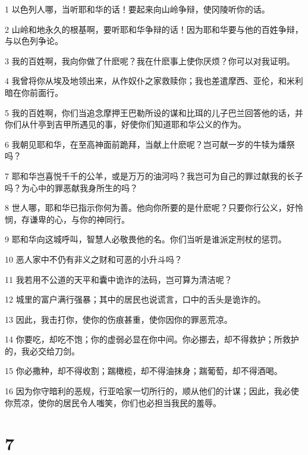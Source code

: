 \par 1 以色列人哪，当听耶和华的话！要起来向山岭争辩，使冈陵听你的话。
\par 2 山岭和地永久的根基啊，要听耶和华争辩的话！因为耶和华要与他的百姓争辩，与以色列争论。
\par 3 我的百姓啊，我向你做了什麽呢？我在什麽事上使你厌烦？你可以对我证明。
\par 4 我曾将你从埃及地领出来，从作奴仆之家救赎你；我也差遣摩西、亚伦，和米利暗在你前面行。
\par 5 我的百姓啊，你们当追念摩押王巴勒所设的谋和比珥的儿子巴兰回答他的话，并你们从什亭到吉甲所遇见的事，好使你们知道耶和华公义的作为。
\par 6 我朝见耶和华，在至高神面前跪拜，当献上什麽呢？岂可献一岁的牛犊为燔祭吗？
\par 7 耶和华岂喜悦千千的公羊，或是万万的油河吗？我岂可为自己的罪过献我的长子吗？为心中的罪恶献我身所生的吗？
\par 8 世人哪，耶和华已指示你何为善。他向你所要的是什麽呢？只要你行公义，好怜悯，存谦卑的心，与你的神同行。
\par 9 耶和华向这城呼叫，智慧人必敬畏他的名。你们当听是谁派定刑杖的惩罚。
\par 10 恶人家中不仍有非义之财和可恶的小升斗吗？
\par 11 我若用不公道的天平和囊中诡诈的法码，岂可算为清洁呢？
\par 12 城里的富户满行强暴；其中的居民也说谎言，口中的舌头是诡诈的。
\par 13 因此，我击打你，使你的伤痕甚重，使你因你的罪恶荒凉。
\par 14 你要吃，却吃不饱；你的虚弱必显在你中间。你必挪去，却不得救护；所救护的，我必交给刀剑。
\par 15 你必撒种，却不得收割；踹橄榄，却不得油抹身；踹葡萄，却不得酒喝。
\par 16 因为你守暗利的恶规，行亚哈家一切所行的，顺从他们的计谋；因此，我必使你荒凉，使你的居民令人嗤笑，你们也必担当我民的羞辱。

\chapter{7}

